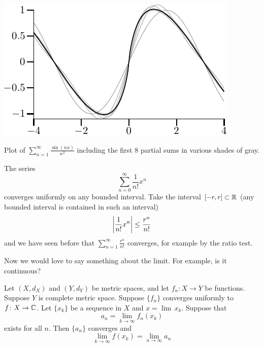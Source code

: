 \begin{myfigureht}
\includegraphics{figures/fouriersern2}
\caption{Plot of 
$\sum_{n=1}^\infty \frac{\sin(n x)}{n^2}$ including
the first 8 partial sums in various shades of gray.\label{fig:fouriersern2}}
\end{myfigureht}

\begin{example}
The series
\begin{equation*}
\sum_{n=0}^\infty \frac{1}{n!} x^n
\end{equation*}
converges uniformly on any bounded interval.
Take the interval $[-r,r] \subset {\mathbb{R}}$ (any bounded interval
is contained in such an interval)
\begin{equation*}
\left\lvert {\frac{1}{n!} x^n} \right\rvert \leq 
\frac{r^n}{n!}
\end{equation*}
and we have seen before that
$\sum_{n=1}^\infty \frac{r^n}{n!}$ converges, for example by the ratio test.
\end{example}

Now we would love to say something about the limit.  For example, is it
continuous?


\begin{prop} \label{prop:uniformswitch}
Let $(X,d_X)$ and $(Y,d_Y)$ be metric spaces, and let
$f_n \colon X \to Y$ be functions.
Suppose $Y$ is complete metric space.
Suppose $\{ f_n \}$ converges uniformly to $f \colon X \to {\mathbb{C}}$.  
Let $\{ x_k \}$ be a sequence in $X$ and $x = \lim \, x_k$.  Suppose
that
\begin{equation*}
a_n = \lim_{k \to \infty} f_n(x_k)
\end{equation*}
exists for all $n$.  Then
$\{a_n\}$ converges and 
\begin{equation*}
\lim_{k \to \infty} f(x_k) = \lim_{n\to\infty} a_n
\end{equation*}
\end{prop}


